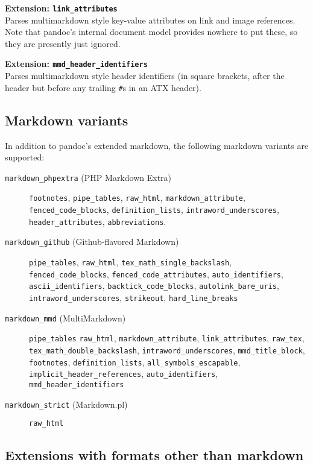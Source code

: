 \documentclass[]{article}
\begin{document}
\textbf{Extension: \texttt{link\_attributes}}\\Parses multimarkdown
style key-value attributes on link and image references. Note that
pandoc's internal document model provides nowhere to put these, so they
are presently just ignored.

\textbf{Extension: \texttt{mmd\_header\_identifiers}}\\Parses
multimarkdown style header identifiers (in square brackets, after the
header but before any trailing \texttt{\#}s in an ATX header).

\subsection{Markdown variants}\label{markdown-variants}

In addition to pandoc's extended markdown, the following markdown
variants are supported:

\begin{description}
\item[\texttt{markdown\_phpextra} (PHP Markdown Extra)]
\texttt{footnotes}, \texttt{pipe\_tables}, \texttt{raw\_html},
\texttt{markdown\_attribute}, \texttt{fenced\_code\_blocks},
\texttt{definition\_lists}, \texttt{intraword\_underscores},
\texttt{header\_attributes}, \texttt{abbreviations}.
\item[\texttt{markdown\_github} (Github-flavored Markdown)]
\texttt{pipe\_tables}, \texttt{raw\_html},
\texttt{tex\_math\_single\_backslash}, \texttt{fenced\_code\_blocks},
\texttt{fenced\_code\_attributes}, \texttt{auto\_identifiers},
\texttt{ascii\_identifiers}, \texttt{backtick\_code\_blocks},
\texttt{autolink\_bare\_uris}, \texttt{intraword\_underscores},
\texttt{strikeout}, \texttt{hard\_line\_breaks}
\item[\texttt{markdown\_mmd} (MultiMarkdown)]
\texttt{pipe\_tables} \texttt{raw\_html}, \texttt{markdown\_attribute},
\texttt{link\_attributes}, \texttt{raw\_tex},
\texttt{tex\_math\_double\_backslash}, \texttt{intraword\_underscores},
\texttt{mmd\_title\_block}, \texttt{footnotes},
\texttt{definition\_lists}, \texttt{all\_symbols\_escapable},
\texttt{implicit\_header\_references}, \texttt{auto\_identifiers},
\texttt{mmd\_header\_identifiers}
\item[\texttt{markdown\_strict} (Markdown.pl)]
\texttt{raw\_html}
\end{description}

\subsection{Extensions with formats other than
markdown}\label{extensions-with-formats-other-than-markdown}
\end{document}
